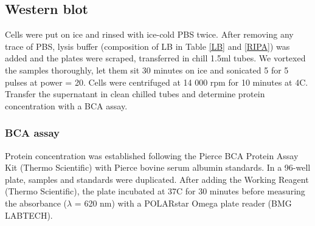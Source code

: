 \documentclass[onecolumn,10pt]{asme2ej}
\begin{document}
\subsection{Western blot}
Cells were put on ice and rinsed with ice-cold PBS twice. After removing any trace of PBS, lysis buffer (composition of LB in Table \ref{LB} and \ref{RIPA}) was added and  the plates were scraped, transferred in chill 1.5ml tubes. We vortexed the samples thoroughly, let them sit 30 minutes on ice and sonicated 5 for 5 pulses at power = 20. 
Cells were centrifuged at 14 000 rpm for 10 minutes at 4C. Transfer the supernatant in clean chilled tubes and determine protein concentration with a BCA assay. 


\subsubsection{BCA assay}
Protein concentration was established following the Pierce BCA Protein Assay Kit (Thermo Scientific) with Pierce bovine serum albumin standards. In a 96-well plate, samples and standards were duplicated. After adding the Working Reagent (Thermo Scientific), the plate incubated at 37C for 30 minutes before measuring the absorbance ($\lambda$ = 620 nm) with a POLARstar Omega plate reader (BMG LABTECH).

%
%
%

\end{document}

